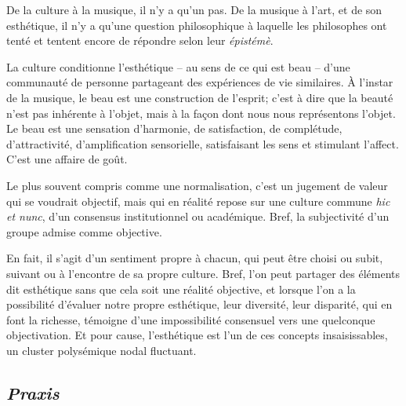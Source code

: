 \documentclass{article}
\begin{document}
De la culture à la musique, il n'y a qu'un pas. De la musique à l'art, et de son esthétique, il n'y a qu'une question philosophique à laquelle les philosophes  ont tenté et tentent encore de répondre selon leur \textit{épistémè}.

La culture conditionne l'esthétique -- au sens de ce qui est beau -- d'une communauté de personne partageant des expériences de vie similaires. 
À l'instar de la musique, le beau est une construction de l'esprit; c'est à dire que la beauté n'est pas inhérente à l'objet, mais à la façon dont nous nous représentons l'objet. Le beau est une sensation d'harmonie, de satisfaction, de complétude, d'attractivité, d'amplification sensorielle, satisfaisant les sens et stimulant l'affect. C'est une affaire de goût.

Le plus souvent compris comme une normalisation, c'est un jugement de valeur qui se voudrait objectif, mais qui en réalité repose sur une culture commune \textit{hic et nunc}, d'un consensus institutionnel ou académique. Bref, la subjectivité d'un groupe admise comme objective.

 En fait, il s'agit d'un sentiment propre à chacun, qui peut être choisi ou subit, suivant ou à l'encontre de sa propre culture. Bref, l'on peut partager des éléments dit esthétique sans que cela soit une réalité objective, et lorsque l'on a la possibilité d'évaluer notre propre esthétique, leur diversité, leur disparité,  qui en font la richesse, témoigne d'une impossibilité consensuel vers une quelconque objectivation. Et pour cause, l'esthétique est l'un de ces concepts insaisissables, un cluster polysémique nodal fluctuant.


\subsection{\textit{Praxis}} 
\end{document}
